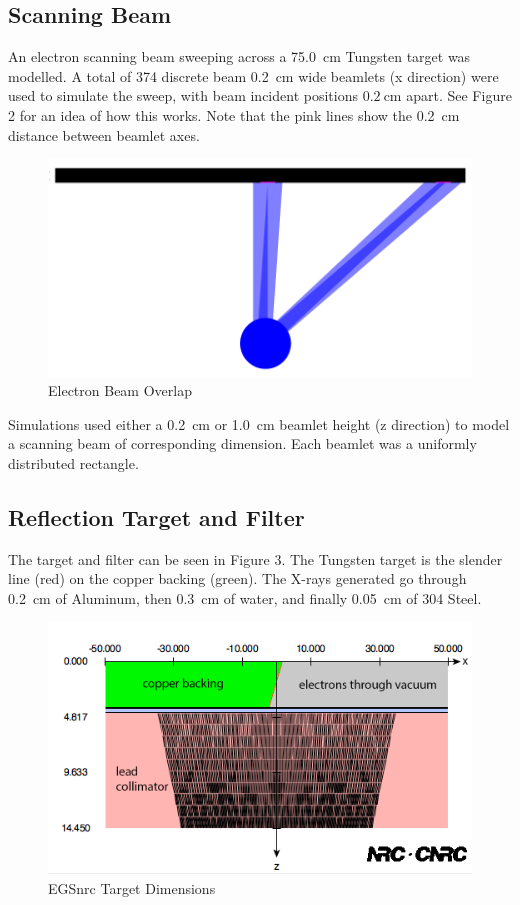 \documentclass[12pt]{article}
\begin{document}
\subsection*{Scanning Beam}
An electron scanning beam sweeping across a \SI{75.0}{\cm} Tungsten target was modelled. A total of 374 discrete beam \SI{0.2}{\cm} wide beamlets (x direction) were used to simulate the sweep, with beam incident positions $\SI{0.2}{\cm}$ apart. See Figure 2 for an idea of how this works. Note that the pink lines show the \SI{0.2}{\cm} distance between beamlet axes.

\begin{figure}[H]
\centering
\includegraphics[scale=0.3]{../beam-geometry.png}
\caption{Electron Beam Overlap}
\end{figure}

Simulations used either a \SI{0.2}{\cm} or \SI{1.0}{\cm} beamlet height (z direction) to model a scanning beam of corresponding dimension. Each beamlet was a uniformly distributed rectangle.

\subsection*{Reflection Target and Filter}
The target and filter can be seen in Figure 3. The Tungsten target is the slender line (red) on the copper backing (green). The X-rays generated go through \SI{0.2}{\cm} of Aluminum, then \SI{0.3}{\cm} of water, and finally \SI{0.05}{\cm} of 304 Steel.

\begin{figure}[H]
\centering
\includegraphics[scale=0.3]{../egs-geometry.png}
\caption{EGSnrc Target Dimensions}
\end{figure}
\end{document}

